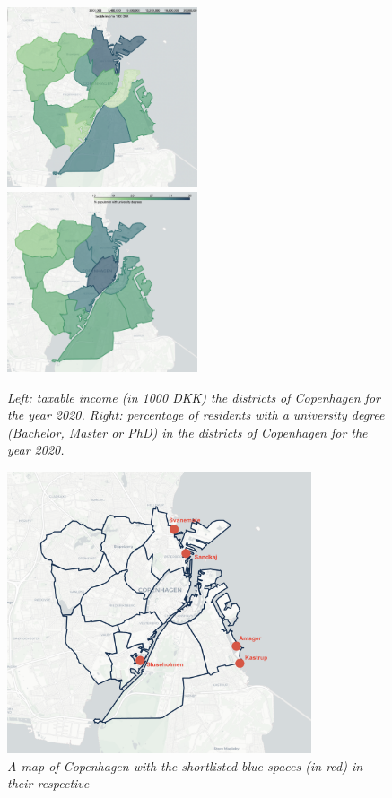\documentclass{article}
\begin{document}
\begin{figure}[ht]
	\includegraphics[width=0.5\textwidth]{copenhagen_income_taxable.png}
	\includegraphics[width=0.5\textwidth]{copenhagen_edu.png}
	\caption{\textit{Left: taxable income (in 1000 DKK) the districts of Copenhagen for the year 2020. Right: percentage of residents with a university degree (Bachelor, Master or PhD) in the districts of Copenhagen for the year 2020.}}
	  \label{fig:map_income}
\end{figure}

\begin{figure}[ht]
	\centering
	\includegraphics[width=0.8\textwidth]{copenhagen_bs_shortlist.png}
	\caption{\textit{A map of Copenhagen with the shortlisted blue spaces (in red) in their respective}}
	  \label{fig:ubs}
\end{figure}
\end{document}
